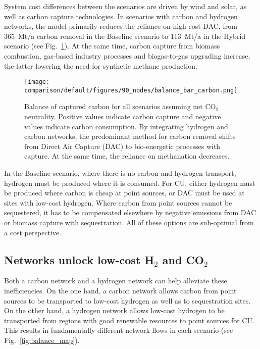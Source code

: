 \documentclass[twocolumn]{article}
\newcommand{\carbon}{CO$_2$}
\newcommand{\hydrogen}{H$_2$}
\newcommand{\baselinescenario}{Baseline scenario}
\newcommand{\hybridscenario}{Hybrid scenario}
\begin{document}
System cost differences between the scenarios are driven by wind and solar, as well as carbon capture technologies. In scenarios with carbon and hydrogen networks, the model primarily reduces the reliance on high-cost DAC, from 365~Mt/a carbon removal in the \baselinescenario{} to 113~Mt/a in the \hybridscenario{} (see Fig.~\ref{fig:balance_captured_carbon}). At the same time, carbon capture from biomass combustion, gas-based industry processes and biogas-to-gas upgrading increase, the latter lowering the need for synthetic methane production.

\begin{figure}[ht!]
    \centering
    \texttt{[image: comparison/default/figures/90\_nodes/balance\_bar\_carbon.png]}
    \caption{Balance of captured carbon for all scenarios assuming net \carbon{} neutrality. Positive values indicate carbon capture and negative values indicate carbon consumption. By integrating hydrogen and carbon networks, the predominant method for carbon removal shifts from Direct Air Capture (DAC) to bio-energetic processes with capture. At the same time, the reliance on methanation decreases.}
    \label{fig:balance_captured_carbon}
\end{figure}

In the \baselinescenario{}, where there is no carbon and hydrogen transport, hydrogen must be produced where it is consumed. For CU, either hydrogen must be produced where carbon is cheap at point sources, or DAC must be used at sites with low-cost hydrogen. Where carbon from point sources cannot be sequestered, it has to be compensated elsewhere by negative emissions from DAC or biomass capture with sequestration. All of these options are sub-optimal from a cost perspective.

\subsection*{Networks unlock low-cost \hydrogen{} and \carbon{}}

Both a carbon network and a hydrogen network can help alleviate these inefficiencies. On the one hand, a carbon network allows carbon from point sources to be transported to low-cost hydrogen as well as to sequestration sites. On the other hand, a hydrogen network allows low-cost hydrogen to be transported from regions with good renewable resources to point sources for CU. This results in fundamentally different network flows in each scenario (see Fig.~\ref{fig:balance_map}).
\end{document}
